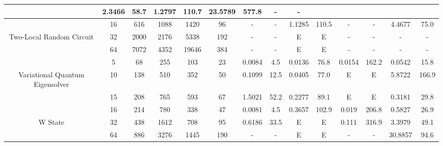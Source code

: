 \begin{table}[htb]
{\begin{tabular}{|c|c|c|c|c|c|c|c|c|c|c|c|c|c|}
 & 2.3466 & 58.7
 & 1.2797 & 110.7
 & 23.5789 & 577.8
 & - & -
 \\
\hline
 & 
16 & 616 & 1088 & 1420 & 96
 & - & -
 & 1.1285 & 110.5
 & - & -
 & 4.4677 & 75.0
 \\
Two-Local Random Circuit & 
32 & 2000 & 2176 & 5338 & 192
 & - & -
 & E & E
 & - & -
 & - & -
 \\
 & 
64 & 7072 & 4352 & 19646 & 384
 & - & -
 & E & E
 & - & -
 & - & -
 \\
\hline
 & 
5 & 68 & 255 & 103 & 23
 & 0.0084 & 4.5
 & 0.0136 & 76.8
 & 0.0154 & 162.2
 & 0.0542 & 15.8
 \\
Variational Quantum Eigensolver & 
10 & 138 & 510 & 352 & 50
 & 0.1099 & 12.5
 & 0.0405 & 77.0
 & E & E
 & 5.8722 & 166.9
 \\
 & 
15 & 208 & 765 & 593 & 67
 & 1.5021 & 52.2
 & 0.2277 & 89.1
 & E & E
 & 0.3181 & 29.8
 \\
\hline
 & 
16 & 214 & 780 & 338 & 47
 & 0.0081 & 4.5
 & 0.3657 & 102.9
 & 0.019 & 206.8
 & 0.5827 & 26.9
 \\
W State & 
32 & 438 & 1612 & 708 & 95
 & 0.6186 & 33.5
 & E & E
 & 0.111 & 316.9
 & 3.3979 & 49.1
 \\
 & 
64 & 886 & 3276 & 1445 & 190
 & - & -
 & E & E
 & - & -
 & 30.8857 & 94.6
 \\
\hline
\end{tabular}}
\end{table}